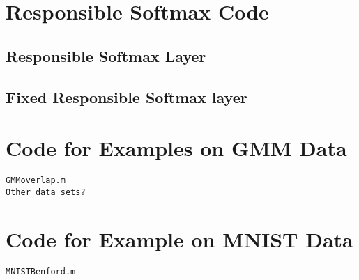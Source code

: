 



\chapter{Responsible Softmax Code}\label{app:RScode}
\section{Responsible Softmax Layer}\label{code:RSlayer}







\section{Fixed Responsible Softmax layer}\label{code:fixedRSLayer}



\chapter{Code for Examples on GMM Data}
\begin{verbatim}
GMMoverlap.m 
Other data sets?
\end{verbatim}

\chapter{Code for Example on MNIST Data}
\begin{verbatim}
MNISTBenford.m
\end{verbatim}